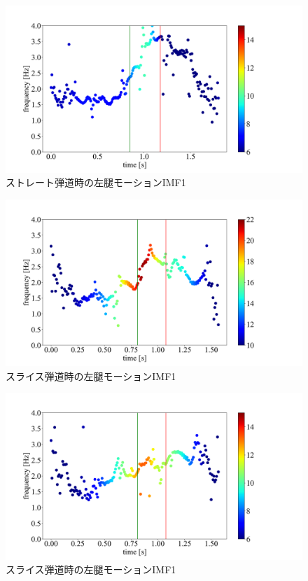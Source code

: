 \begin{figure}
    \centering
    \includegraphics[width=1.0\linewidth]{./images/straight_data/left_leg/IMF4.png}
    \caption{ストレート弾道時の左腿モーションIMF1}
    \label{straight left leg imf4}
\end{figure}

\begin{figure}
    \centering
    \includegraphics[width=1.0\linewidth]{./images/opening_data/left_up_leg/IMF4.png}
    \caption{スライス弾道時の左腿モーションIMF1}
    \label{opening left up leg imf4}
\end{figure}

\begin{figure}
    \centering
    \includegraphics[width=1.0\linewidth]{./images/opening_data/left_leg/IMF4.png}
    \caption{スライス弾道時の左腿モーションIMF1}
    \label{opening left leg imf4}
\end{figure}

